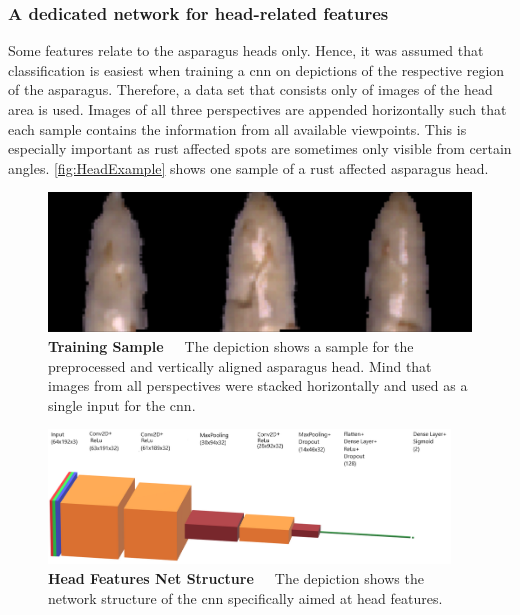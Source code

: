 \subsubsection{A dedicated network for head-related features}
\label{subsec:HeadNetwork}

Some features relate to the asparagus heads only. Hence, it was assumed that classification is easiest when training a \acrshort{cnn} on depictions of the respective region of the asparagus. Therefore, a data set that consists only of images of the head area is used. Images of all three perspectives are appended horizontally such that each sample contains the information from all available viewpoints. This is especially important as rust affected spots are sometimes only visible from certain angles. \autoref{fig:HeadExample} shows one sample of a rust affected asparagus head.

\begin{figure}[!htb]
	\centering
	\includegraphics[scale=0.4]{Figures/chapter04/head_example.png}
	\decoRule
	\caption[Head Features CNN Training Sample]{\textbf{Training Sample}~~~The depiction shows a sample for the preprocessed and vertically aligned asparagus head. Mind that images from all perspectives were stacked horizontally and used as a single input for the \acrshort{cnn}.}
	\label{fig:HeadExample}
\end{figure}

\begin{figure}[!htb]
	\centering
	\includegraphics[width=0.95\textwidth]{Figures/chapter04/head_net_structure.png}
	\decoRule
	\caption[Head Features Net Structure]{\textbf{Head Features Net Structure}~~~The depiction shows the network structure of the \acrshort{cnn} specifically aimed at head features.}
	\label{tab:HeadNetStructure}
\end{figure}


